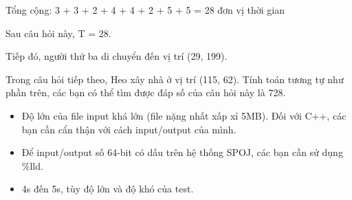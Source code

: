    Tổng cộng: 3 + 3 + 2 + 4 + 4 + 2 + 5 + 5 = 28 đơn vị thời gian  

   Sau câu hỏi này, T = 28.  

   Tiếp đó, người thứ ba di chuyển đến vị trí (29, 199).  

   Trong câu hỏi tiếp theo, Heo xây nhà ở vị trí (115, 62). Tính toán tương tự như phần trên, các bạn có thể tìm được đáp số của câu hỏi này là 728.
\begin{itemize}
	\item     Độ lớn của file input khá lớn (file nặng nhất xấp xỉ 5MB). Đối với C++, các bạn cần cẩn thận với cách input/output của mình.   
	\item     Để input/output số 64-bit có dấu trên hệ thống SPOJ, các bạn cần sử dụng \%lld.   
\end{itemize}
\begin{itemize}
	\item     4s đến 5s, tùy độ lớn và độ khó của test.   
\end{itemize}